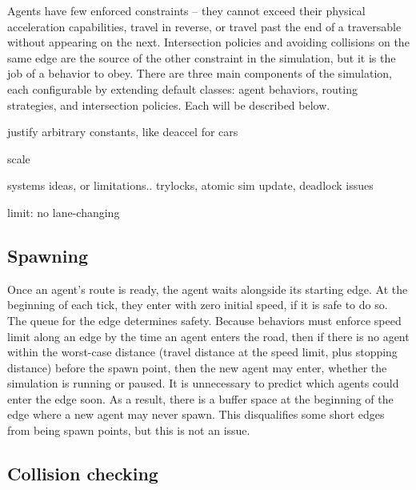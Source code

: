 \documentclass[letterpaper, 10 pt, conference]{ieeeconf}  %
\begin{document}
Agents have few enforced constraints -- they cannot exceed their physical
acceleration capabilities, travel in reverse, or travel past the end of a
traversable without appearing on the next. Intersection policies and avoiding
collisions on the same edge are the source of the other constraint in the
simulation, but it is the job of a behavior to obey. There are three main
components of the simulation, each configurable by extending default classes:
agent behaviors, routing strategies, and intersection policies. Each will be
described below.


justify arbitrary constants, like deaccel for cars

scale 

systems ideas, or limitations.. trylocks, atomic sim update, deadlock issues

limit: no lane-changing

\subsection{Spawning}


Once an agent's route is ready, the agent waits alongside its starting edge. At
the beginning of each tick, they enter with zero initial speed, if it is safe to
do so. The queue for the edge determines safety. Because behaviors must enforce
speed limit along an edge by the time an agent enters the road, then if there is
no agent within the worst-case distance (travel distance at the speed limit,
plus stopping distance) before the spawn point, then the new agent may enter,
whether the simulation is running or paused. It is unnecessary to predict which
agents could enter the edge soon. As a result, there is a buffer space at the
beginning of the edge where a new agent may never spawn. This disqualifies some
short edges from being spawn points, but this is not an issue.

\subsection{Collision checking}
\end{document}
